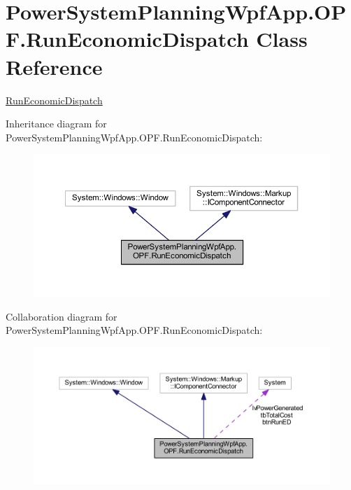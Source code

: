 \hypertarget{class_power_system_planning_wpf_app_1_1_o_p_f_1_1_run_economic_dispatch}{}\section{Power\+System\+Planning\+Wpf\+App.\+O\+P\+F.\+Run\+Economic\+Dispatch Class Reference}
\label{class_power_system_planning_wpf_app_1_1_o_p_f_1_1_run_economic_dispatch}


\hyperlink{class_power_system_planning_wpf_app_1_1_o_p_f_1_1_run_economic_dispatch}{Run\+Economic\+Dispatch}  




Inheritance diagram for Power\+System\+Planning\+Wpf\+App.\+O\+P\+F.\+Run\+Economic\+Dispatch\+:
\nopagebreak
\begin{figure}[H]
\begin{center}
\leavevmode
\includegraphics[width=350pt]{class_power_system_planning_wpf_app_1_1_o_p_f_1_1_run_economic_dispatch__inherit__graph}
\end{center}
\end{figure}


Collaboration diagram for Power\+System\+Planning\+Wpf\+App.\+O\+P\+F.\+Run\+Economic\+Dispatch\+:
\nopagebreak
\begin{figure}[H]
\begin{center}
\leavevmode
\includegraphics[width=350pt]{class_power_system_planning_wpf_app_1_1_o_p_f_1_1_run_economic_dispatch__coll__graph}
\end{center}
\end{figure}
